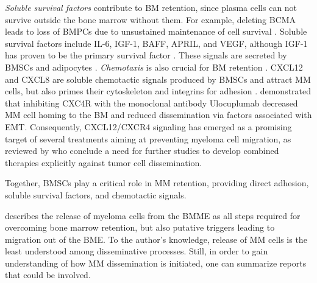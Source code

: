 \emph{Soluble survival factors} contribute to \ac{BM} retention, since plasma
cells can not survive outside the bone marrow without them. For example,
deleting BCMA  leads to loss of
\acp{BMPC}  due to unsustained maintenance of cell survival
\cite{oconnorBCMAEssentialSurvival2004}. Soluble survival factors include IL-6,
IGF-1, BAFF, APRIL, and VEGF, although IGF-1 has proven to be the primary
survival factor \cite{sprynskiRoleIGF1Major2009}. These signals are secreted by
\acp{BMSC} and adipocytes \cite{kiblerAdhesiveInteractionsHuman1998,
    garcia-ortizRoleTumorMicroenvironment2021}. \emph{Chemotaxis} is also crucial
for \ac{BM} retention \cite{ullahRoleCXCR4Multiple2019}. CXCL12 and CXCL8 are
soluble chemotactic signals produced by \acp{BMSC} and attract \ac{MM} cells,
but also primes their cytoskeleton and integrins for adhesion
\cite{aggarwalChemokinesMultipleMyeloma2006,
    alsayedMechanismsRegulationCXCR42007}.
\citet{roccaroCXCR4RegulatesExtraMedullary2015} demonstrated that inhibiting
CXC4R   with the monoclonal antibody
Ulocuplumab decreased \ac{MM} cell homing to the \ac{BM} and reduced
dissemination via factors associated with \ac{EMT}. Consequently, CXCL12/CXCR4
signaling has emerged as a promising target of several treatments aiming at
preventing myeloma cell migration, as reviewed by
\citet{itoRoleTherapeuticTargeting2021} who conclude a need for further studies
to develop combined therapies explicitly against tumor cell dissemination.

Together, \acp{BMSC} play a critical role in \ac{MM} retention, providing direct
adhesion, soluble survival factors, and chemotactic signals.


%
\label{sec:intro_myeloma_release}%
\citet{zeissigTumourDisseminationMultiple2020} describes the release of myeloma
cells from the \ac{BMME} as all steps required for overcoming bone marrow
retention, but also putative triggers leading to migration out of the BME. To
the author's knowledge, release of \ac{MM} cells is the least understood among
disseminative processes. Still, in order to gain understanding of how \ac{MM}
dissemination is initiated, one can summarize reports that could be involved.


